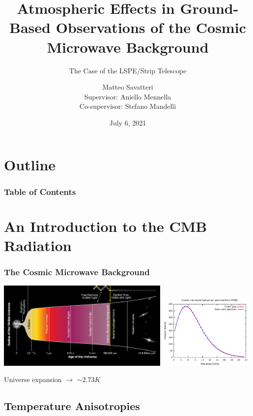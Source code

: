 \documentclass[10pt,aspectratio=169]{beamer}
\title{Atmospheric Effects in Ground-Based Observations of the Cosmic
Microwave Background}
\subtitle{The Case of the LSPE/Strip Telescope}
\author[Matteo Savatteri]{Matteo Savatteri\\[1ex]  {\footnotesize Supervisor:
Aniello Mennella\\[1ex]  Co-supervisor: Stefano Mandelli}}
\institute{Università degli Studi di Milano} \date{July 6, 2021}
\begin{document}
\frame{\titlepage}

\section*{Outline}
\begin{frame}
\frametitle{Table of Contents}
\tableofcontents
\end{frame}

\section{An Introduction to the CMB Radiation}

\begin{frame}
\frametitle{The Cosmic Microwave Background}

\includegraphics[width=0.63\textwidth]{universe_expansion_2}
\pause
\includegraphics[width=0.35\textwidth]{CMB_Spectrum_COBE}

\pause

\vspace{0.5cm}
\hfill Universe expansion $\rightarrow$ \alert{$\sim 2.73 K$}

\end{frame}

\subsection{Temperature Anisotropies}
\end{document}
